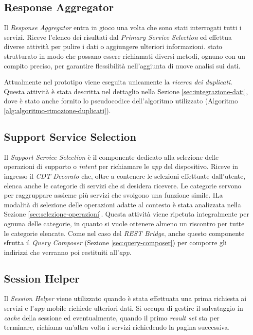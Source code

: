 \subsection{Response Aggregator\label{sec:response-aggregator}}

Il \emph{Response Aggregator} entra in gioco una volta che sono stati interrogati tutti i servizi. Riceve l'elenco dei risultati dal \emph{Primary Service Selection} ed effettua diverse attività per pulire i dati o aggiungere ulteriori informazioni. \upe stato strutturato in modo che possano essere richiamati diversi metodi, ognuno con un compito preciso, per garantire flessibilità nell'aggiunta di nuove analisi sui dati.

Attualmente nel prototipo viene eseguita unicamente la \emph{ricerca dei duplicati}. Questa attività è stata descritta nel dettaglio nella Sezione \ref{sec:integrazione-dati}, dove è stato anche fornito lo pseudocodice dell'algoritmo utilizzato (Algoritmo \ref{alg:algoritmo-rimozione-duplicati}).

\subsection{Support Service Selection\label{sec:support-service-selection}}

Il \emph{Support Service Selection} è il componente dedicato alla selezione delle operazioni di supporto o \emph{intent} per richiamare le \emph{app} del dispositivo. Riceve in ingresso il \emph{CDT Decorato} che, oltre a contenere le selezioni effettuate dall'utente, elenca anche le categorie di servizi che si desidera ricevere. Le categorie servono per raggruppare assieme più servizi che svolgono una funzione simile. ILa modalità di selezione delle operazioni adatte al contesto è stata analizzata nella Sezione \ref{sec:selezione-operazioni}. Questa attività viene ripetuta integralmente per ognuna delle categorie, in quanto si vuole ottenere almeno un riscontro per tutte le categorie elencate. Come nel caso del \emph{REST Bridge}, anche questo componente sfrutta il \emph{Query Composer} (Sezione \ref{sec:query-composer}) per comporre gli indirizzi che verranno poi restituiti all'\emph{app}.

\subsection{Session Helper\label{sec:session-helper}}

Il \emph{Session Helper} viene utilizzato quando è stata effettuata una prima richiesta ai servizi e l'\emph{app} mobile richiede ulteriori dati. Si occupa di gestire il salvataggio in \emph{cache} della sessione ed eventualmente, quando il primo \emph{result set} sta per terminare, richiama un'altra volta i servizi richiedendo la pagina successiva.

